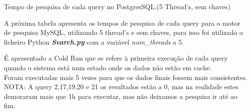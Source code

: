 \documentclass{article}
\begin{document}
\begin{table}[H]
    \caption{Tempo de pesquisa de cada query no PostgresSQL.(5 Thread's, sem chaves)}
    \label{tab:BC_Table3}
  \end{table}
\clearpage

\texttt{}\par A próxima tabela apresenta os tempos de pesquisa de cada query para o motor de pesquisa MySQL, utilizando 5 thread's e sem chaves, para isso foi utilizado o ficheiro Python \textbf{\textit{Search.py}}  com a variável \textit{num\_threads} a 5. 
\texttt{}\par É apresentado a Cold Run que se refere à primeira execução de cada query quando o sistema está num estado onde os dados não estão em cache.\\
Foram executadas mais 5 vezes para que os dados finais fossem mais consistentes.\\
NOTA: A query 2,17,19,20 e 21 os resultados estão a 0, mas na realidade estes demoraram mais que 1h para executar, mas não deixamos a pesquisa ir até ao fim.
\end{document}
